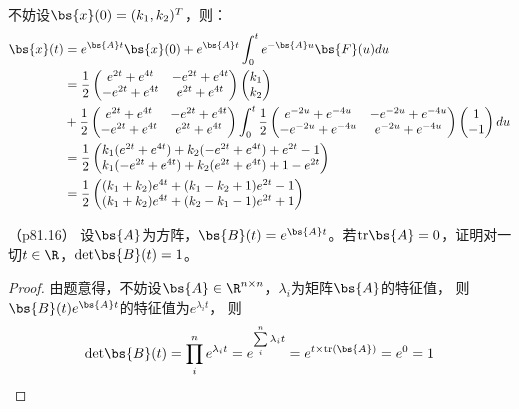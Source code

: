 \documentclass[12pt, a4paper, oneside, UTF8]{ctexbook}
\begin{document}
\begin{solution}
    不妨设$\bs{x}(0)=(k_1,k_2)^T$，则：
    \begin{align*}
        \bs{x}(t)&=e^{\bs{A}t}\bs{x}(0)+e^{\bs{A}t}\int_{0}^t e^{-\bs{A}u}\bs{F}(u) du\\
        &=\frac{1}{2}\begin{pmatrix}
            e^{2t}+e^{4t} & -e^{2t}+e^{4t}\\
        -e^{2t}+e^{4t}& e^{2t}+e^{4t}
        \end{pmatrix}\begin{pmatrix}
            k_1 \\
            k_2
        \end{pmatrix}\\
        &+\frac{1}{2}\begin{pmatrix}
            e^{2t}+e^{4t} & -e^{2t}+e^{4t}\\
            -e^{2t}+e^{4t}& e^{2t}+e^{4t}
        \end{pmatrix}\int_{0}^t
        \frac{1}{2}\begin{pmatrix}
            e^{-2u}+e^{-4u} & -e^{-2u}+e^{-4u}\\
            -e^{-2u}+e^{-4u}& e^{-2u}+e^{-4u}
        \end{pmatrix} \begin{pmatrix}
            1\\
            -1
        \end{pmatrix} du \\
        &=\frac{1}{2} \begin{pmatrix}
            k_1(e^{2t}+e^{4t})+k_2(-e^{2t}+e^{4t})+e^{2t}-1 \\
            k_1(-e^{2t}+e^{4t})+k_2(e^{2t}+e^{4t})+1-e^{2t}
        \end{pmatrix}\\
        &=\frac{1}{2} \begin{pmatrix}
           (k_1+k_2)e^{4t}+(k_1-k_2+1)e^{2t}-1 \\
            (k_1+k_2)e^{4t}+(k_2-k_1-1)e^{2t}+1
        \end{pmatrix}
        \end{align*}
\end{solution}


\begin{question}（p81.16）
    设$\bs{A}$为方阵，$\bs{B}(t)=e^{\bs{A}t}$。若$\mathrm{tr}\bs{A}=0$，证明对一切$t \in \R$，$\mathrm{det}\bs{B}(t)=1$。
\end{question}

\begin{proof}
    由题意得，不妨设$\bs{A}\in \R^{n\times n}$，$\lambda_i$为矩阵$\bs{A}$的特征值，
    则$\bs{B}(t)e^{\bs{A}t}$的特征值为$e^{\lambda_i t}$，
    则
    \begin{align*}
    \mathrm{det}\bs{B}(t)=\prod\limits_{i}^ne^{\lambda_i  t}=
    e^{\sum\limits_{i}^n \lambda_i t}=e^{t \times \mathrm{tr}(\bs{A})}=e^0=1
    \end{align*}
    
\end{proof}


\ifx\allfiles\undefined
\end{document}
